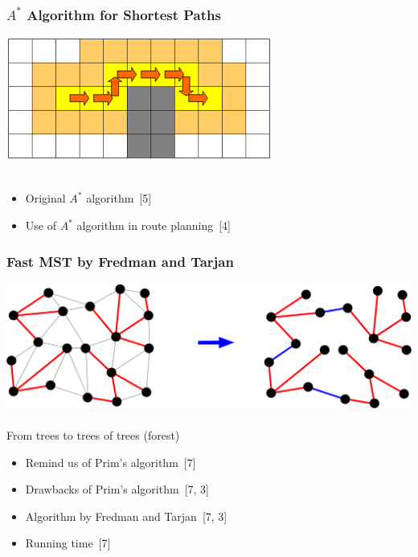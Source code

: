 \documentclass[titlepage,german,presentation]{beamer}
\begin{document}
\begin{frame}
\frametitle{$A^*$ Algorithm for Shortest Paths}

\begin{center}
\includegraphics[height=0.2\textwidth]{obstacle.png}\\
~\\
\end{center}

\begin{itemize}
\item Original $A^*$ algorithm~[5]
\medskip
\item Use of $A^*$ algorithm in route planning~[4] 
\end{itemize}

\end{frame}
\begin{frame}
\frametitle{Fast MST by Fredman and Tarjan}

\begin{center}
\includegraphics[height=0.2\textwidth]{FredmanTarjan}\\
~\\
From trees to trees of trees (forest)
\end{center}

\begin{itemize}
\item Remind us of Prim's algorithm~[7]
\medskip
\item Drawbacks of Prim's algorithm~[7, 3]
\medskip
\item Algorithm by Fredman and Tarjan~[7, 3]
\medskip
\item Running time~[7]
\end{itemize}

\end{frame}
\end{document}
